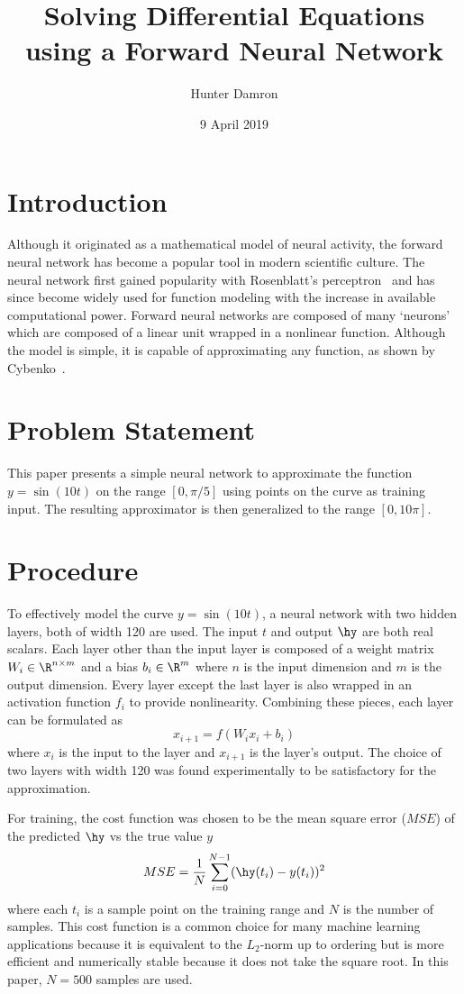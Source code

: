 \documentclass{article}
\title{Solving Differential Equations using a Forward Neural Network}
\author{Hunter Damron}
\date{9 April 2019}
\begin{document}
    \maketitle

    \section{Introduction}
        Although it originated as a mathematical model of neural activity, the forward neural network has become a popular tool in modern scientific culture. The neural network first gained popularity with Rosenblatt's perceptron~\cite{rosenblatt} and has since become widely used for function modeling with the increase in available computational power. Forward neural networks are composed of many `neurons' which are composed of a linear unit wrapped in a nonlinear function. Although the model is simple, it is capable of approximating any function, as shown by Cybenko~\cite{approx}.
    \section{Problem Statement}
        This paper presents a simple neural network to approximate the function $y = \sin(10t)$ on the range $[0,\pi/5]$ using points on the curve as training input. The resulting approximator is then generalized to the range $[0,10\pi]$.
    \section{Procedure}
        To effectively model the curve $y = \sin(10t)$, a neural network with two hidden layers, both of width 120 are used. The input $t$ and output $\hy$ are both real scalars. Each layer other than the input layer is composed of a weight matrix $W_i \in \R^{n \times m}$ and a bias $b_i \in \R^m$ where $n$ is the input dimension and $m$ is the output dimension. Every layer except the last layer is also wrapped in an activation function $f_i$ to provide nonlinearity. Combining these pieces, each layer can be formulated as \[ x_{i+1} = f(W_i x_i + b_i) \] where $x_i$ is the input to the layer and $x_{i+1}$ is the layer's output. The choice of two layers with width 120 was found experimentally to be satisfactory for the approximation.

        For training, the cost function was chosen to be the mean square error ($MSE$) of the predicted $\hy$ vs the true value $y$ \[ MSE = \frac{1}{N} \sum_{i=0}^{N-1} (\hy(t_i) - y(t_i))^2 \] where each $t_i$ is a sample point on the training range and $N$ is the number of samples. This cost function is a common choice for many machine learning applications because it is equivalent to the $L_2$-norm up to ordering but is more efficient and numerically stable because it does not take the square root. In this paper, $N = 500$ samples are used.
\end{document}
